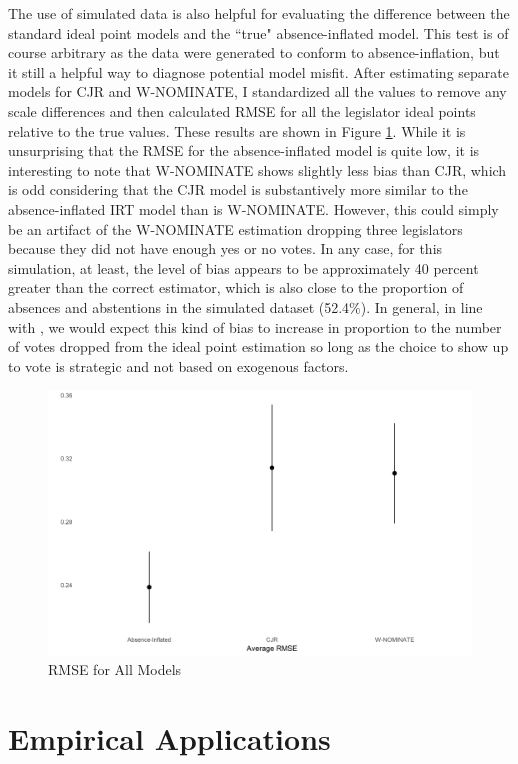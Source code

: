 	The use of simulated data is also helpful for evaluating the difference between the standard ideal point models and the ``true" absence-inflated model. This test is of course arbitrary as the data were generated to conform to absence-inflation, but it still a helpful way to diagnose potential model misfit. After estimating separate models for CJR and W-NOMINATE, I standardized all the values to remove any scale differences and then calculated RMSE for all the legislator ideal points relative to the true values. These results are shown in Figure \ref{sim_rmse}. While it is unsurprising that the RMSE for the absence-inflated model is quite low, it is interesting to note that W-NOMINATE shows slightly less bias than CJR, which is odd considering that the CJR model is substantively more similar to the absence-inflated IRT model than is W-NOMINATE. However, this could simply be an artifact of the W-NOMINATE estimation dropping three legislators because they did not have enough yes or no votes. In any case, for this simulation, at least, the level of bias appears to be approximately 40 percent greater than the correct estimator, which is also close to the proportion of absences and abstentions in the simulated dataset (52.4\%). In general, in line with \textcite{rosas2015}, we would expect this kind of bias to increase in proportion to the number of votes dropped from the ideal point estimation so long as the choice to show up to vote is strategic and not based on exogenous factors.
	
	\begin{figure}
		\caption{RMSE for All Models}\label{sim_rmse}
		\includegraphics[width=\linewidth]{sim_rmse_allmods}
	\end{figure} 
	
	
	\section{Empirical Applications}
	
